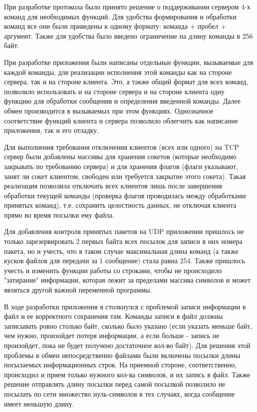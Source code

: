 При разработке протокола было принято решение о поддерживании сервером 4-х команд для необходимых функций. Для удобства формирования и обработки команд все они были приведены к одному формату: команда + пробел + аргумент. Также для удобства было введено ограничение на длину команды в 256 байт.

При разработке приложения были написаны отдельные функции, вызываемые для каждой команды, для реализации исполнения этой команды как на стороне сервера, так и на стороне клиента. Это, а также общий формат для всех команд, позволило использовать и на стороне сервера и на стороне клиента одну функцию для обработки сообщения и определения введенной команды. Далее обмен производится в вызываемых при этом функциях. Однозначное соответствие функций клиента и сервера позволило облегчить как написание приложения, так и его отладку.

Для выполнения требования отключения клиентов (всех или одного) на TCP сервер были добавлены массивы для хранения сокетов (которые необходимо закрывать по требованию сервера) и для хранения флагов (флаги указывают, занят ли сокет клиентом, свободен или требуется закрытие этого сокета). Такая реализация позволила отключать всех клиентов лишь после завершения обработки текущей команды (проверка флагов проводилась между обработками принятых команд), т.е. сохранить целостность данных, не отключая клиента прямо во время посылки ему файла.

Для добавления контроля принятых пакетов на UDP приложении пришлось не только зарезервировать 2 первых байта всех посылок для записи в них номера пакета, но и учесть, что в таком случае максимальная длина команд (а также кусков файлов для передачи за 1 сообщение) стала равна 254. Также пришлось учесть и изменить функции работы со строками, чтобы не происходило "затирание" информации, которая лежит за пределами массива символов и может являться другой важной переменной программы.

В ходе разработки приложения я столкнулся с проблемой записи информации в файл и ее корректного сохранения там. Команды записи в файл должны записывать ровно столько байт, сколько было указано (если указать меньше байт, чем нужно, произойдет потеря информации, а если больше - запись не произойдет, пока не будет получено достаточное кол-во байт). Для решения этой проблемы в обмен непосредственно файлами были включены посылки длины посылаемых информационных строк. На приемной стороне, соответственно, происходил и прием только нужного кол-ва символов, и их запись в файл. Также решение отправлять длину посылки перед самой посылкой позволило не посылать по сети множество нуль-символов в тех случаях, когда сообщение имеет меньшую длину.

